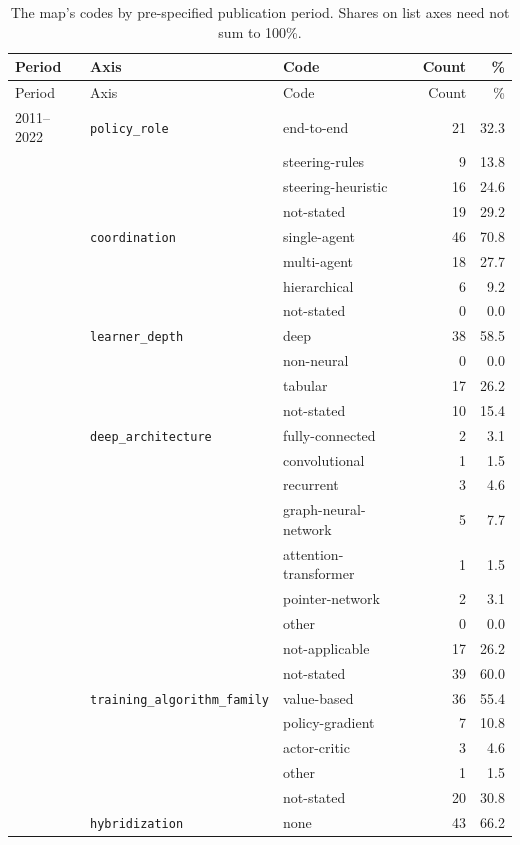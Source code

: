 \begin{longtable}{lllr@{\hspace{1.0em}}r}
\caption{The map's codes by pre-specified publication period. Shares on list axes need not sum to 100\%.}
\label{tab:map-by-period}\\
\toprule
Period & Axis & Code & Count & \% \\
\midrule
\endfirsthead
\toprule
Period & Axis & Code & Count & \% \\
\midrule
\endhead
2011--2022 & \texttt{policy\_role} & end-to-end & 21 & 32.3 \\
 &  & steering-rules & 9 & 13.8 \\
 &  & steering-heuristic & 16 & 24.6 \\
 &  & not-stated & 19 & 29.2 \\
 & \texttt{coordination} & single-agent & 46 & 70.8 \\
 &  & multi-agent & 18 & 27.7 \\
 &  & hierarchical & 6 & 9.2 \\
 &  & not-stated & 0 & 0.0 \\
 & \texttt{learner\_depth} & deep & 38 & 58.5 \\
 &  & non-neural & 0 & 0.0 \\
 &  & tabular & 17 & 26.2 \\
 &  & not-stated & 10 & 15.4 \\
 & \texttt{deep\_architecture} & fully-connected & 2 & 3.1 \\
 &  & convolutional & 1 & 1.5 \\
 &  & recurrent & 3 & 4.6 \\
 &  & graph-neural-network & 5 & 7.7 \\
 &  & attention-transformer & 1 & 1.5 \\
 &  & pointer-network & 2 & 3.1 \\
 &  & other & 0 & 0.0 \\
 &  & not-applicable & 17 & 26.2 \\
 &  & not-stated & 39 & 60.0 \\
 & \texttt{training\_algorithm\_family} & value-based & 36 & 55.4 \\
 &  & policy-gradient & 7 & 10.8 \\
 &  & actor-critic & 3 & 4.6 \\
 &  & other & 1 & 1.5 \\
 &  & not-stated & 20 & 30.8 \\
 & \texttt{hybridization} & none & 43 & 66.2 \\

\end{longtable}

